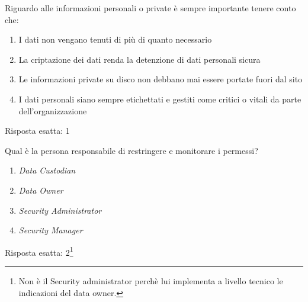 
\begin{Exercise} [
  title={Gestione delle informazioni personali},
  label={infoSec3}
  ]
  
  \Question Riguardo alle informazioni personali o private è sempre importante 
  tenere conto che:
  \begin{enumerate}
    \item I dati non vengano tenuti di più di quanto necessario
    \item La criptazione dei dati renda la detenzione di dati personali sicura
    \item Le informazioni private su disco non debbano mai essere portate fuori 
    dal sito
    \item I dati personali siano sempre etichettati e gestiti come critici o 
    vitali da parte dell'organizzazione
  \end{enumerate}
\end{Exercise}


\begin{Answer} [
  ref={infoSec3},
  number={3}
  ]
  
  \Question Risposta esatta: 1
  
\end{Answer}



\begin{Exercise} [
  title={Monitoraggio dei permessi dei dati.},
  label={infoSec4}
  ]
  
  \Question Qual è la persona responsabile di restringere e monitorare i 
  permessi?
  \begin{enumerate}
    \item \textit{Data Custodian}
    \item \textit{Data Owner}
    \item \textit{Security Administrator}
    \item \textit{Security Manager}
  \end{enumerate}
\end{Exercise}


\begin{Answer} [
  ref={infoSec4},
  number={4}
  ]
  
  \Question Risposta esatta: 2\footnote{
  Non è il Security administrator perchè lui implementa a livello
  tecnico le indicazioni del data owner.}
  
\end{Answer}
